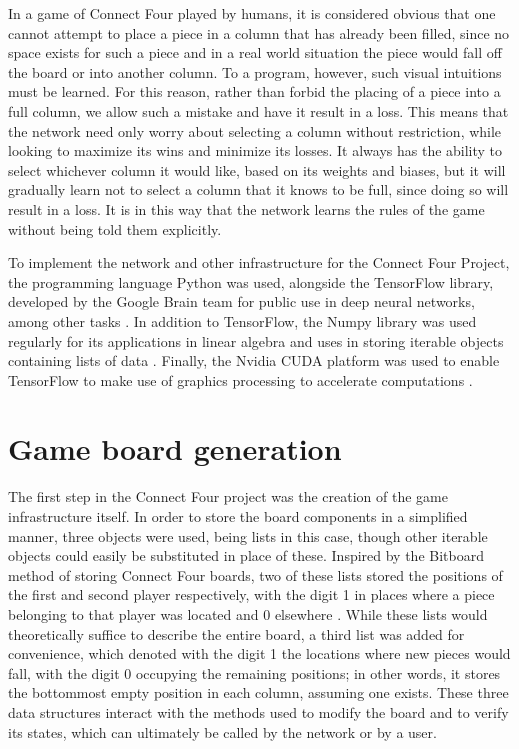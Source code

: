 \documentclass[12pt]{article}
\begin{document}
In a game of Connect Four played by humans, it is considered obvious that one cannot attempt to place a piece in a column that has already been filled, since no space exists for such a piece and in a real world situation the piece would fall off the board or into another column. To a program, however, such visual intuitions must be learned. For this reason, rather than forbid the placing of a piece into a full column, we allow such a mistake and have it result in a loss. This means that the network need only worry about selecting a column without restriction, while looking to maximize its wins and minimize its losses. It always has the ability to select whichever column it would like, based on its weights and biases, but it will gradually learn not to select a column that it knows to be full, since doing so will result in a loss. It is in this way that the network learns the rules of the game without being told them explicitly.

To implement the network and other infrastructure for the Connect Four Project, the programming language Python was used, alongside the TensorFlow library, developed by the Google Brain team for public use in deep neural networks, among other tasks \cite{TensorFlow, TensorFlowDoc}. In addition to TensorFlow, the Numpy library was used regularly for its applications in linear algebra and uses in storing iterable objects containing lists of data \cite{NumPy}. Finally, the Nvidia CUDA platform was used to enable TensorFlow to make use of graphics processing to accelerate computations \cite{CUDA}.

\section{Game board generation}
The first step in the Connect Four project was the creation of the game infrastructure itself. In order to store the board components in a simplified manner, three objects were used, being lists in this case, though other iterable objects could easily be substituted in place of these. Inspired by the Bitboard method of storing Connect Four boards, two of these lists stored the positions of the first and second player respectively, with the digit 1 in places where a piece belonging to that player was located and 0 elsewhere \cite{Bitboard}. While these lists would theoretically suffice to describe the entire board, a third list was added for convenience, which denoted with the digit 1 the locations where new pieces would fall, with the digit 0 occupying the remaining positions; in other words, it stores the bottommost empty position in each column, assuming one exists. These three data structures interact with the methods used to modify the board and to verify its states, which can ultimately be called by the network or by a user.
\end{document}
